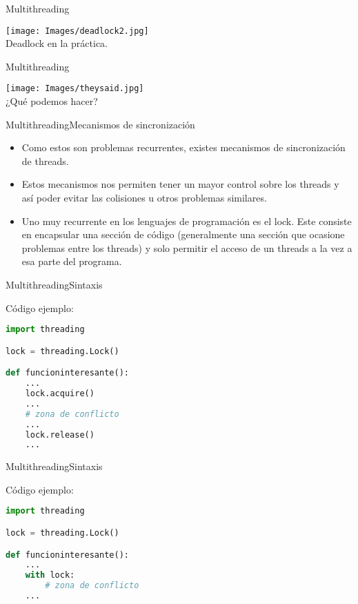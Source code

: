 \documentclass[spanish]{beamer}
\begin{document}
\begin{frame}{Multithreading}
  \begin{center}
    \texttt{[image: Images/deadlock2.jpg]}
    \\
    Deadlock en la práctica.
  \end{center}
\end{frame}

\begin{frame}{Multithreading}
  \begin{center}
    \texttt{[image: Images/theysaid.jpg]}
    \pause
    \\
    ¿Qué podemos hacer?
  \end{center}
\end{frame}

\begin{frame}{Multithreading}{Mecanismos de sincronización}
  \begin{itemize}
  \item
    Como estos son problemas recurrentes, existes mecanismos de sincronización de \alert{threads}.
  \item
    Estos mecanismos nos permiten tener un mayor control sobre los \alert{threads} y así poder evitar las colisiones u otros problemas similares.
  \item
    Uno muy recurrente en los lenguajes de programación es el \alert{lock}. Este consiste en encapsular una sección de código (generalmente una sección que ocasione problemas entre los \alert{threads}) y solo permitir el acceso de un \alert{threads} a la vez a esa parte del programa.
  \end{itemize}
\end{frame}

\begin{frame}[fragile]{Multithreading}{Sintaxis}

Código ejemplo:
  \begin{lstlisting}[language=Python]
import threading

lock = threading.Lock()

def funcioninteresante():
    ...
    lock.acquire()
    ...
    # zona de conflicto
    ...
    lock.release()
    ...
  \end{lstlisting}
\end{frame}

\begin{frame}[fragile]{Multithreading}{Sintaxis}

Código ejemplo:
  \begin{lstlisting}[language=Python]
import threading

lock = threading.Lock()

def funcioninteresante():
    ...
    with lock:
        # zona de conflicto
    ...
  \end{lstlisting}
\end{frame}
\end{document}

